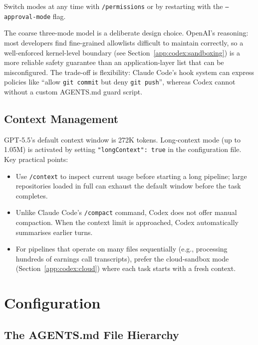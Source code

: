 Switch modes at any time with \texttt{/permissions} or by restarting with the
\texttt{--approval-mode} flag.

\begin{deepdive}
The coarse three-mode model is a deliberate design choice.  OpenAI's
reasoning: most developers find fine-grained allowlists difficult to maintain
correctly, so a well-enforced kernel-level boundary (see
Section~\ref{app:codex:sandboxing}) is a more reliable safety guarantee than
an application-layer list that can be misconfigured.  The trade-off is
flexibility: Claude Code's hook system can express policies like ``allow
\texttt{git commit} but deny \texttt{git push}'', whereas Codex cannot without
a custom AGENTS.md guard script.
\end{deepdive}

\subsection{Context Management}
\label{app:codex:context}

GPT-5.5's default context window is 272K tokens.  Long-context mode (up to
1.05M) is activated by setting \texttt{"longContext": true} in the
configuration file.  Key practical points:

\begin{itemize}
  \item Use \texttt{/context} to inspect current usage before starting a
        long pipeline; large repositories loaded in full can exhaust the
        default window before the task completes.
  \item Unlike Claude Code's \texttt{/compact} command, Codex does not offer
        manual compaction.  When the context limit is approached, Codex
        automatically summarises earlier turns.
  \item For pipelines that operate on many files sequentially (e.g., processing
        hundreds of earnings call transcripts), prefer the cloud-sandbox mode
        (Section~\ref{app:codex:cloud}) where each task starts with a fresh
        context.
\end{itemize}

\section{Configuration}
\label{app:codex:config}

\subsection{The AGENTS.md File Hierarchy}
\label{app:codex:agents-md}

